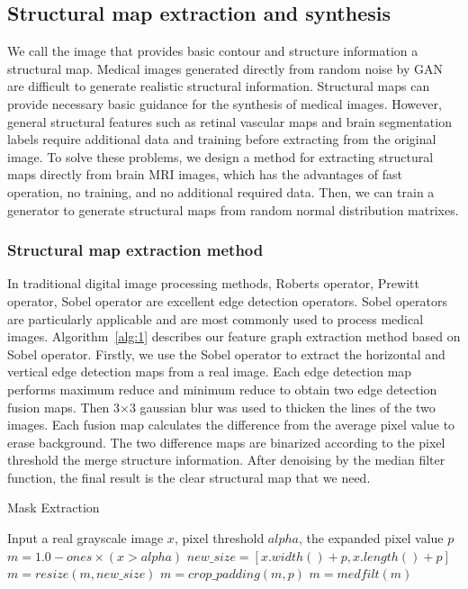 \documentclass[runningheads]{llncs}
\begin{document}
\subsection{Structural map extraction and synthesis}
We call the image that provides basic contour and structure information a structural map.  Medical images generated directly from random noise by GAN are difficult to generate realistic structural information. Structural maps can provide necessary basic guidance for the synthesis of medical images. However, general structural features such as retinal vascular maps\cite{41costa2017towards} and brain segmentation labels \cite{4shin2018medical}require additional data and training before extracting from the original image. To solve these problems, we design a method for extracting structural maps directly from brain MRI images, which has the advantages of fast operation, no training, and no additional required data. Then, we can train a generator to generate structural maps from random normal distribution matrixes.
\subsubsection{Structural map extraction method}
In traditional digital image processing methods, Roberts operator\cite{145Roberts}, Prewitt operator\cite{146prewitt}, Sobel operator\cite{147Sobel} are excellent edge detection operators. Sobel operators are particularly applicable and are most commonly used to process medical images. Algorithm~\ref{alg:1} describes our feature graph extraction method based on Sobel operator. Firstly, we use the Sobel operator to extract the horizontal and vertical edge detection maps from a real image. Each edge detection map performs maximum reduce and minimum reduce to obtain two edge detection fusion maps. Then 3$\times$3 gaussian blur was used to thicken the lines of the two images. Each fusion map calculates the difference from the average pixel value to erase  background. The two difference maps are binarized according to the pixel threshold the merge structure information. After denoising by the median filter function, the final result is the clear structural map that we need.

\begin{algorithm}
	\caption{Mask Extraction}
	\label{alg:2}
	\begin{algorithmic}[1]
		\State Input a real grayscale image $x$,  pixel threshold $alpha$, the expanded pixel value $p$
		\State $m = 1.0 - ones \times (x > alpha)$
		\State $new\_size=[x.width() + p, x.length() + p]$
		\State $m = resize(m, new\_size)$
		\State $m = crop\_padding(m,p)$
		\State $m = medfilt(m)$
	\end{algorithmic}  
\end{algorithm}
\end{document}
